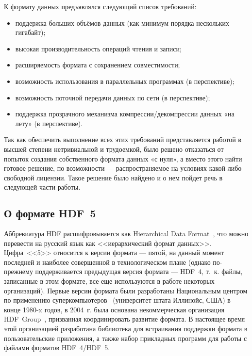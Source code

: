 К формату данных предъявлялся следующий список требований:
\begin{itemize}
\item поддержка больших объёмов данных (как минимум порядка нескольких
      гигабайт);
\item высокая производительность операций чтения и записи;
\item расширяемость формата с сохранением совместимости;
\item возможность использования в параллельных программах (в перспективе);
\item возможность поточной передачи данных по сети (в перспективе);
\item поддержка прозрачного механизма компрессии/декомпрессии данных «на лету»
      (в перспективе).
\end{itemize}

Так как обеспечить выполнение всех этих требований представляется работой
в высшей степени нетривиальной и трудоемкой, было решено отказаться от попыток
создания собственного формата данных «с нуля», а вместо этого найти готовое
решение, по возможности --- распространяемое на условиях какой-либо свободной
лицензии. Такое решение было найдено и о нем пойдет речь в следующей части
работы.


\subsection{О формате HDF~5}

Аббревиатура HDF расшифровывается как Hierarchical Data Format~\cite{bib:Hdf5WikipediaArticle}, что можно
перевести на русский язык как <<иерархический формат данных>>. Цифра~<<5>>
относится к версии формата --- пятой, на данный момент последней и наиболее
совершенной в технологическом плане (однако по-прежнему поддерживается
предыдущая версия формата --- HDF~4, т.~к. файлы, записанные в этом формате,
все еще используются в работе некоторых организаций). Первые версии формата
были разработаны Национальным центром по применению
суперкомпьютеров~\cite{bib:NcsaWebsite} (университет штата Иллинойс, США) в конце
1980-x годов, в 2004~г. была основана некоммерческая организация HDF~Group~\cite{bib:HdfGroupWebsite},
призванная координировать развитие формата. В настоящее время этой организацией
разработана библиотека для встраивания поддержки формата в пользовательские
приложения, а также набор прикладных программ для работы с файлами форматов
HDF~4/HDF~5.

